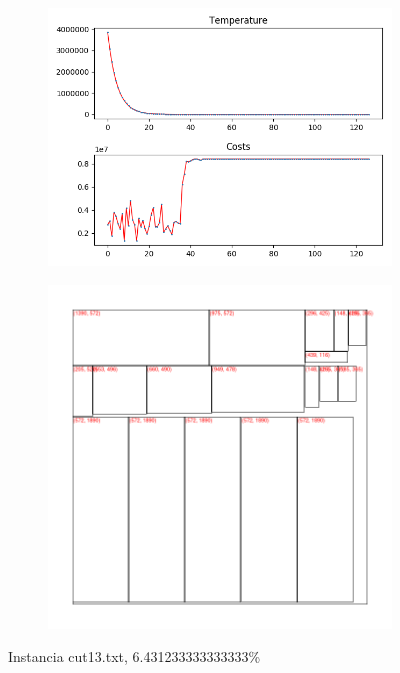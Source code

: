 \begin{figure}
\centering
\begin{subfigure}{.5\textwidth}
  \centering
  \includegraphics[width=1\linewidth]{results/cut13/3/plot}
  \label{fig:sub1}
\end{subfigure}%
\begin{subfigure}{.5\textwidth}
  \centering
  \includegraphics[width=1\linewidth]{results/cut13/3/cut}
  \label{fig:sub2}
\end{subfigure}
\caption{Instancia cut13.txt, 6.431233333333333\%}
\label{fig:test}
\end{figure}


